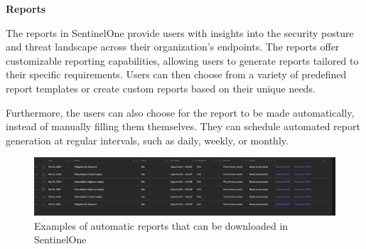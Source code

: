 \textbf{Reports}

The reports in SentinelOne provide users with insights into the security posture and threat landscape across their organization's
endpoints. The reports offer customizable reporting capabilities, allowing users to generate reports tailored to their specific
requirements. Users can then choose from a variety of predefined report templates or create custom reports based on their unique
needs.

Furthermore, the users can also choose for the report to be made automatically, instead of manually filling them themselves. They can
schedule automated report generation at regular intervals, such as daily, weekly, or monthly.

\begin{figure}[htbp]
      \centering
      \includegraphics[width=1.0\textwidth]{Figures/SentinelOne/Reports.png}
      \caption{Examples of automatic reports that can be downloaded in SentinelOne}
      \label{fig:Reports}
\end{figure}






